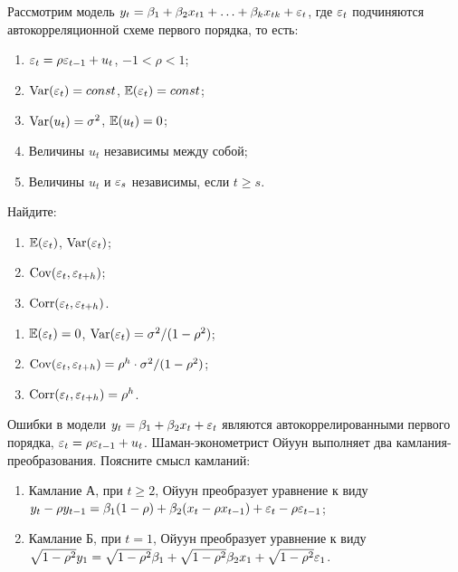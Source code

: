 \begin{problem}
Рассмотрим модель $y_t=\beta_1+\beta_2 x_{t1}+\ldots+\beta_k x_{tk}+\varepsilon_t$, где $\varepsilon_t$ подчиняются автокорреляционной схеме первого порядка, то есть:
\begin{enumerate}
\item $\varepsilon_t=\rho \varepsilon_{t-1}+u_t$, $-1<\rho<1$;
\item $\operatorname{Var}(\varepsilon_t)=const$, $\mathbb{E}(\varepsilon_t)=const$;
\item $\operatorname{Var}(u_t)=\sigma^2$, $\mathbb{E}(u_t)=0$;
\item Величины $u_t$ независимы между собой;
\item Величины $u_t$ и $\varepsilon_s$ независимы, если $t\geq s$.
\end{enumerate}
Найдите:
\begin{enumerate}
\item $\mathbb{E}(\varepsilon_t)$, $\operatorname{Var}(\varepsilon_t)$;
\item $\operatorname{Cov}(\varepsilon_t,\varepsilon_{t+h})$;
\item $\operatorname{Corr}(\varepsilon_t,\varepsilon_{t+h})$.
\end{enumerate}


\begin{sol}
\begin{enumerate}
\item $\mathbb{E}(\varepsilon_t)=0$, $\operatorname{Var}(\varepsilon_t)=\sigma^2/(1-\rho^2)$;
\item $\operatorname{Cov}(\varepsilon_t,\varepsilon_{t+h})=\rho^h\cdot \sigma^2/(1-\rho^2)$;
\item $\operatorname{Corr}(\varepsilon_t,\varepsilon_{t+h})=\rho^h$.
\end{enumerate}
\end{sol}
\end{problem}




\begin{problem}
Ошибки в модели $y_t=\beta_1+\beta_2 x_{t}+\varepsilon_t$ являются автокоррелированными первого порядка, $\varepsilon_t=\rho \varepsilon_{t-1}+u_t$. Шаман-эконометрист Ойуун выполняет два камлания-преобразования. Поясните смысл камланий:
\begin{enumerate}
\item Камлание А, при $t\geq 2$, Ойуун преобразует уравнение к виду $y_t-\rho y_{t-1}=\beta_1(1-\rho)+ \beta_2(x_t-\rho x_{t-1})+\varepsilon_t-\rho \varepsilon_{t-1}$;
\item Камлание Б, при $t=1$, Ойуун преобразует уравнение к виду $\sqrt{1-\rho^2}y_1=\sqrt{1-\rho^2}\beta_1+\sqrt{1-\rho^2}\beta_2 x_1+\sqrt{1-\rho^2}\varepsilon_1$.
\end{enumerate}


\begin{sol}
\end{sol}
\end{problem}



